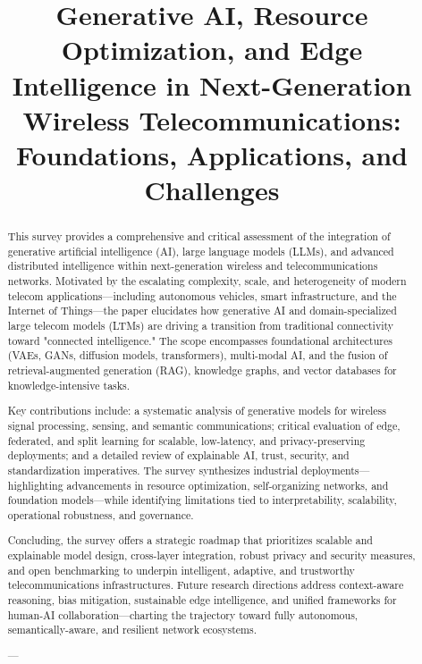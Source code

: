 \title{Generative AI, Resource Optimization, and Edge Intelligence in Next-Generation Wireless Telecommunications: Foundations, Applications, and Challenges}
\maketitle

\begin{abstract}
This survey provides a comprehensive and critical assessment of the integration of generative artificial intelligence (AI), large language models (LLMs), and advanced distributed intelligence within next-generation wireless and telecommunications networks. Motivated by the escalating complexity, scale, and heterogeneity of modern telecom applications—including autonomous vehicles, smart infrastructure, and the Internet of Things—the paper elucidates how generative AI and domain-specialized large telecom models (LTMs) are driving a transition from traditional connectivity toward "connected intelligence." The scope encompasses foundational architectures (VAEs, GANs, diffusion models, transformers), multi-modal AI, and the fusion of retrieval-augmented generation (RAG), knowledge graphs, and vector databases for knowledge-intensive tasks.

Key contributions include: a systematic analysis of generative models for wireless signal processing, sensing, and semantic communications; critical evaluation of edge, federated, and split learning for scalable, low-latency, and privacy-preserving deployments; and a detailed review of explainable AI, trust, security, and standardization imperatives. The survey synthesizes industrial deployments—highlighting advancements in resource optimization, self-organizing networks, and foundation models—while identifying limitations tied to interpretability, scalability, operational robustness, and governance.

Concluding, the survey offers a strategic roadmap that prioritizes scalable and explainable model design, cross-layer integration, robust privacy and security measures, and open benchmarking to underpin intelligent, adaptive, and trustworthy telecommunications infrastructures. Future research directions address context-aware reasoning, bias mitigation, sustainable edge intelligence, and unified frameworks for human-AI collaboration—charting the trajectory toward fully autonomous, semantically-aware, and resilient network ecosystems.

---
\end{abstract}

